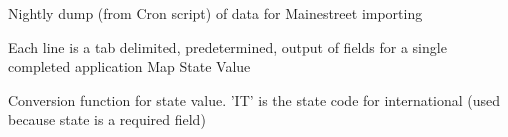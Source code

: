 Nightly dump (from Cron script) of data for Mainestreet importing

Each line is a tab delimited, predetermined, output of fields for a single completed application Map State Value

Conversion function for state value. 'I\-T' is the state code for international (used because state is a required field) 